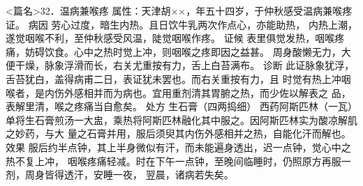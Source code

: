 \documentclass[a4paper,12pt,UTF8,twoside]{ctexbook}
\begin{document}
<篇名>32．温病兼喉疼
属性：天津胡××，年五十四岁，于仲秋感受温病兼喉疼证。 
病因 劳心过度，暗生内热。且日饮牛乳两次作点心，亦能助热， 
内热上潮，遂觉咽喉不利，至仲秋感受风温，陡觉咽喉作疼。 
证候 表里俱觉发热，咽喉疼痛，妨碍饮食。心中之热时觉上冲，则咽喉之疼即因之益甚。 
周身酸懒无力，大便干燥，脉象浮滑而长，右关尤重按有力，舌上白苔满布。 
诊断 此证脉象犹浮，舌苔犹白，盖得病甫二日，表证犹未罢也。而右关重按有力，且 
时觉有热上冲咽喉者，是内伤外感相并而为病也。宜用重剂清其胃腑之热，而少佐以解表之 
品，表解里清，喉之疼痛当自愈矣。 
处方 生石膏（四两捣细） 西药阿斯匹林（一瓦） 
单将生石膏煎汤一大盅，乘热将阿斯匹林融化其中服之。因阿斯匹林实为酸凉解肌之妙药，与大 
量之石膏并用，服后须臾其内伤外感相并之热，自能化汗而解也。 
效果 服后约半点钟，其上半身微似有汗，而未能遍身透出，迟一点钟，觉心中之热不复上冲， 
咽喉疼痛轻减。时在下午一点钟，至晚间临睡时，仍照原方再服一剂，周身皆得透汗，安睡一夜， 
翌晨，诸病若失矣。 
\end{document}
